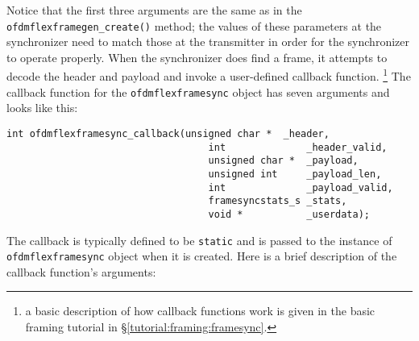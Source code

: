 %
Notice that the first three arguments are the same as in the
{\tt ofdmflexframegen\_create()} method;
the values of these parameters at the synchronizer need to match those
at the transmitter in order for the synchronizer to operate properly.
%
When the synchronizer does find a frame, it attempts to decode the header
and payload and invoke a user-defined callback function.%
\footnote{a basic description of how callback functions work is given in
          the basic framing tutorial in
          \S\ref{tutorial:framing:framesync}.}
The callback function for the {\tt ofdmflexframesync} object has seven
arguments and looks like this:
%
\begin{Verbatim}[fontsize=\small]
    int ofdmflexframesync_callback(unsigned char *  _header,
                                   int              _header_valid,
                                   unsigned char *  _payload,
                                   unsigned int     _payload_len,
                                   int              _payload_valid,
                                   framesyncstats_s _stats,
                                   void *           _userdata);
\end{Verbatim}
%
The callback is typically defined to be {\tt static} and is passed to
the instance of {\tt ofdmflexframesync} object when it is created.
Here is a brief description of the callback function's arguments:
%
